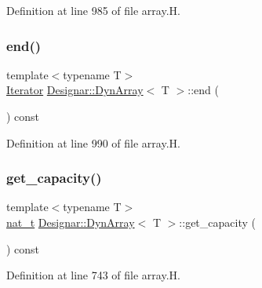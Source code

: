 Definition at line 985 of file array.\+H.

\mbox{\label{class_designar_1_1_dyn_array_ab2ff81ff5bfeefbcd0a302da9effff89}} 
\subsubsection{\texorpdfstring{end()}{end()}\hspace{0.1cm}{\footnotesize\ttfamily [2/2]}}
{\footnotesize\ttfamily template$<$typename T$>$ \\
\hyperlink{class_designar_1_1_dyn_array_1_1_iterator}{Iterator} \hyperlink{class_designar_1_1_dyn_array}{Designar\+::\+Dyn\+Array}$<$ T $>$\+::end (\begin{DoxyParamCaption}{ }\end{DoxyParamCaption}) const\hspace{0.3cm}{\ttfamily [inline]}}



Definition at line 990 of file array.\+H.

\mbox{\label{class_designar_1_1_dyn_array_afa027281e5790d05269d5972ec2ea177}} 
\subsubsection{\texorpdfstring{get\+\_\+capacity()}{get\_capacity()}}
{\footnotesize\ttfamily template$<$typename T$>$ \\
\hyperlink{namespace_designar_aa72662848b9f4815e7bf31a7cf3e33d1}{nat\+\_\+t} \hyperlink{class_designar_1_1_dyn_array}{Designar\+::\+Dyn\+Array}$<$ T $>$\+::get\+\_\+capacity (\begin{DoxyParamCaption}{ }\end{DoxyParamCaption}) const\hspace{0.3cm}{\ttfamily [inline]}}



Definition at line 743 of file array.\+H.

\mbox{\label{class_designar_1_1_dyn_array_a85d8c50ef17c71d675961ba0268c2278}} 
